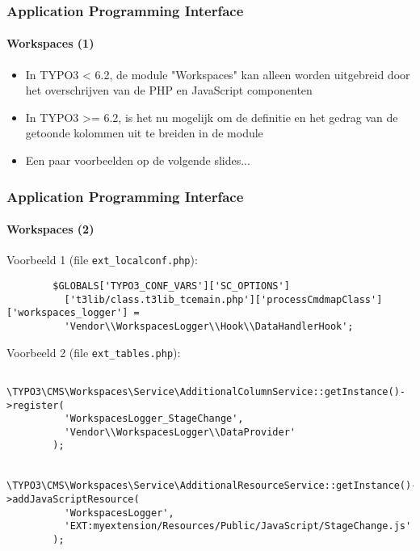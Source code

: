 
\begin{frame}[fragile]
	\frametitle{Application Programming Interface}
	\framesubtitle{Workspaces (1)}

	\begin{itemize}
		\item In TYPO3 < 6.2, de module "Workspaces" kan alleen worden uitgebreid door het overschrijven van de PHP en JavaScript componenten
		\item In TYPO3 >= 6.2, is het nu mogelijk om de definitie en het gedrag van de getoonde kolommen uit te breiden in de module
		\item Een paar voorbeelden op de volgende slides...
	\end{itemize}

\end{frame}


\begin{frame}[fragile]
	\frametitle{Application Programming Interface}
	\framesubtitle{Workspaces (2)}

	\lstset{
		basicstyle=\tiny\ttfamily
	}

	Voorbeeld 1 (file \texttt{ext\_localconf.php}):

	\begin{lstlisting}
		$GLOBALS['TYPO3_CONF_VARS']['SC_OPTIONS']
		  ['t3lib/class.t3lib_tcemain.php']['processCmdmapClass']['workspaces_logger'] =
		  'Vendor\\WorkspacesLogger\\Hook\\DataHandlerHook';
	\end{lstlisting}

	Voorbeeld 2 (file \texttt{ext\_tables.php}):

	\begin{lstlisting}
		\TYPO3\CMS\Workspaces\Service\AdditionalColumnService::getInstance()->register(
		  'WorkspacesLogger_StageChange',
		  'Vendor\\WorkspacesLogger\\DataProvider'
		);

		\TYPO3\CMS\Workspaces\Service\AdditionalResourceService::getInstance()->addJavaScriptResource(
		  'WorkspacesLogger',
		  'EXT:myextension/Resources/Public/JavaScript/StageChange.js'
		);
	\end{lstlisting}

\end{frame}

